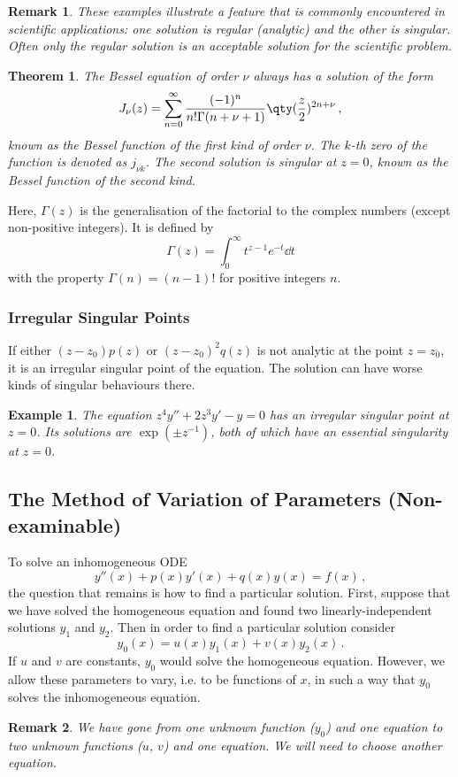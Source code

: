\documentclass{article}
\theoremstyle{plain}\theoremheaderfont{\normalfont\itshape}\theorembodyfont{\rmfamily}\theoremseparator{.}\newtheorem*{rem}{Remark}\newtheorem*{ex}{Example}\newtheorem*{proof}{Proof}\newtheorem*{altp}{Alternative proof}
\theoremstyle{plain}\theoremheaderfont{\normalfont\bfseries}\theorembodyfont{\rmfamily}\theoremseparator{.}\newtheorem{thm}{Theorem}[section]\newtheorem{lem}[thm]{Lemma}\newtheorem{prop}[thm]{Proposition}\newtheorem*{cor}{Corollary}\newtheorem{defn}[thm]{Definition}\newtheorem{clm}[thm]{Claim}\newtheorem{clminproof}{Claim}
\theoremstyle{break}\theoremheaderfont{\normalfont\itshape}\theorembodyfont{\rmfamily}\theoremseparator{.\medskip}\newtheorem*{proofskip}{Proof}\newtheorem*{exs}{Examples}\newtheorem*{rems}{Remarks}
\theoremstyle{break}\theoremheaderfont{\normalfont\bfseries}\theorembodyfont{\rmfamily}\theoremseparator{.\medskip}\newtheorem{lemskip}[thm]{Lemma}\newtheorem{defnskip}[thm]{Definition}\newtheorem{propskip}[thm]{Proposition}\newtheorem{thmskip}[thm]{Theorem}
\numberwithin{equation}{section}
\begin{document}
	\begin{rem}
		These examples illustrate a feature that is commonly encountered in scientific applications: one solution is regular (analytic) and the other is singular. Often only the regular solution is an acceptable solution for the scientific problem.
	\end{rem}
	\begin{thm}
		The Bessel equation of order \(\nu\) always has a solution of the form
		\[J_\nu(z)=\sum_{n=0}^{\infty}\frac{(-1)^n}{n!\Gamma(n+\nu+1)}\qty(\frac{z}{2})^{2n+\nu}\,,\]
		known as the \textit{Bessel function of the first kind} of order \(\nu\). The \(k\)-th zero of the function is denoted as \(j_{\nu k}\). The second solution is singular at \(z=0\), known as the \textit{Bessel function of the second kind}.
	\end{thm}
	Here, \(\Gamma(z)\) is the generalisation of the factorial to the complex numbers (except non-positive integers). It is defined by
	\[\Gamma(z)=\int_{0}^{\infty}t^{z-1} e^{-t}\dd{t}\]
	with the property \(\Gamma(n)=(n-1)!\) for positive integers \(n\).

	\subsubsection{Irregular Singular Points}
	If either \((z-z_0)p(z)\) or \((z-z_0)^2q(z)\) is not analytic at the point \(z=z_0\), it is an irregular singular point of the equation. The solution can have worse kinds of singular behaviours there.

	\begin{ex}
		The equation \(z^4y''+2z^3 y'-y=0\) has an irregular singular point at \(z=0\). Its solutions are \(\exp(\pm z^{-1})\), both of which have an essential singularity at \(z=0\).
	\end{ex}
	\subsection{The Method of Variation of Parameters (Non-examinable)}
	To solve an inhomogeneous ODE
	\[y''(x)+p(x)y'(x)+q(x)y(x)=f(x)\,,\]
	the question that remains is how to find a particular solution. First, suppose that we have solved the homogeneous equation and found two linearly-independent solutions \(y_1\) and \(y_2\). Then in order to find a particular solution consider
	\[y_0(x)=u(x)y_1(x)+v(x)y_2(x)\,.\]
	If \(u\) and \(v\) are constants, \(y_0\) would solve the homogeneous equation. However, we allow these parameters to vary, i.e. to be functions of \(x\), in such a way that \(y_0\) solves the inhomogeneous equation.
	\begin{rem}
		We have gone from one unknown function (\(y_0\)) and one equation to two unknown functions (\(u\), \(v\)) and one equation. We will need to choose another equation.
	\end{rem}
\end{document}
